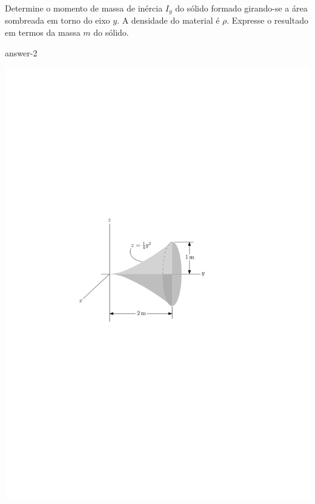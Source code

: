 \item Determine o momento de massa de inércia $I_{y}$ do sólido formado girando-se a área sombreada em torno do eixo $y$. A densidade do material é $\rho$. Expresse o resultado em termos da massa $m$ do sólido.

{answer-2}

\vspace{-1.5cm}
\begin{flushright}
	\includegraphics[scale=1.05]{../../images/draw_2}
\end{flushright}